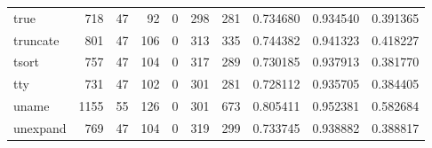 \begin{longtable}{lrrrrrrrrr}
true      &                                                718 &                                                 47 &                                                 92 &                                                  0 &                                                298 &                                                281 &                                           0.734680 &                               0.934540 &                             0.391365 \\
truncate  &                                                801 &                                                 47 &                                                106 &                                                  0 &                                                313 &                                                335 &                                           0.744382 &                               0.941323 &                             0.418227 \\
tsort     &                                                757 &                                                 47 &                                                104 &                                                  0 &                                                317 &                                                289 &                                           0.730185 &                               0.937913 &                             0.381770 \\
tty       &                                                731 &                                                 47 &                                                102 &                                                  0 &                                                301 &                                                281 &                                           0.728112 &                               0.935705 &                             0.384405 \\
uname     &                                               1155 &                                                 55 &                                                126 &                                                  0 &                                                301 &                                                673 &                                           0.805411 &                               0.952381 &                             0.582684 \\
unexpand  &                                                769 &                                                 47 &                                                104 &                                                  0 &                                                319 &                                                299 &                                           0.733745 &                               0.938882 &                             0.388817 \\

\end{longtable}
